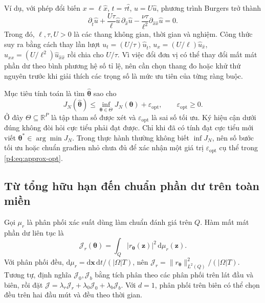 Ví dụ, với phép đổi biến $x=\ell\widehat x$, $t=\tau\widehat t$,
$u=U\widehat u$, phương trình Burgers trở thành
\begin{equation}
 \partial_{\widehat t}\widehat u+
 \frac{U\tau}{\ell}\widehat u\,\partial_{\widehat x}\widehat u
 -\frac{\nu\tau}{\ell^2}\partial_{\widehat x\widehat x}\widehat u=0.
 \label{p4:eq:nondimensional}
\end{equation}
Trong đó, $\ell,\tau,U>0$ là các thang không gian, thời gian và nghiệm.
Công thức suy ra bằng cách thay lần lượt
$u_t=(U/\tau)\widehat u_{\widehat t}$,
$u_x=(U/\ell)\widehat u_{\widehat x}$,
$u_{xx}=(U/\ell^2)\widehat u_{\widehat x\widehat x}$ rồi chia cho
$U/\tau$. Vì việc đổi đơn vị có thể thay đổi mất mát phần dư theo bình
phương hệ số tỉ lệ, nên cần chọn thang đo hoặc khử thứ nguyên trước
khi giải thích các trọng số là mức ưu tiên của từng ràng buộc.

Mục tiêu tính toán là tìm $\widehat{\boldsymbol{\theta}}$ sao cho
\begin{equation}
 J_N(\widehat{\boldsymbol{\theta}})
 \leq\inf_{\boldsymbol{\theta}\in\Theta}J_N(\boldsymbol{\theta})
                  +\varepsilon_{\mathrm{opt}},
 \qquad \varepsilon_{\mathrm{opt}}\geq0.
 \label{p4:eq:approx-opt}
\end{equation}
Ở đây $\Theta\subseteq\mathbb{R}^{P}$ là tập tham số được xét và
$\varepsilon_{\mathrm{opt}}$ là sai số tối ưu. Ký hiệu cận dưới đúng không
đòi hỏi cực tiểu phải đạt được. Chỉ khi đã có tính đạt cực tiểu mới
viết $\boldsymbol{\theta}^{*}\in\arg\min J_N$.
Trong thực hành thường không biết $\inf J_N$, nên số bước tối ưu hoặc
chuẩn građien nhỏ chưa đủ để xác nhận một giá trị
$\varepsilon_{\mathrm{opt}}$ cụ thể trong \eqref{p4:eq:approx-opt}.

\subsection{Từ tổng hữu hạn đến chuẩn phần dư trên toàn miền}

Gọi $\mu_r$ là phân phối xác suất dùng làm chuẩn đánh giá trên $Q$.
Hàm mất mát phần dư liên tục là
\begin{equation}
 \mathcal{J}_r(\boldsymbol{\theta})
 =\int_Q|r_{\boldsymbol{\theta}}(\mathbf{z})|^2\,\mathrm{d}\mu_r(\mathbf{z}).
 \label{p4:eq:population-r}
\end{equation}
Với phân phối đều, $\mathrm{d}\mu_r=\mathrm{d}\mathbf{x}\,\mathrm{d}t/(|\Omega|T)$,
nên $\mathcal{J}_r=\|r_{\boldsymbol{\theta}}\|_{L^2(Q)}^2/(|\Omega|T)$.
Tương tự, định nghĩa $\mathcal{J}_0,\mathcal{J}_b$ bằng tích phân theo
các phân phối trên lát đầu và biên, rồi đặt
$\mathcal{J}=\lambda_r\mathcal{J}_r+\lambda_0\mathcal{J}_0+
\lambda_b\mathcal{J}_b$. Với $d=1$, phân phối trên biên có thể chọn đều
trên hai đầu mút và đều theo thời gian.

